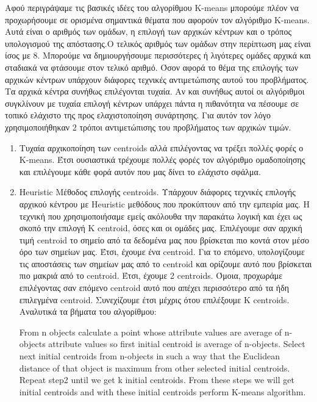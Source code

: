 Αφού περιγράψαμε τις βασικές ιδέες του αλγορίθμου K-means μπορούμε πλέον να προχωρήσουμε σε ορισμένα σημαντικά θέματα που αφορούν τον αλγόριθμο K-means. Αυτά είναι ο αριθμός των ομάδων, η επιλογή των αρχικών κέντρων και ο τρόπος υπολογισμού της απόστασης.Ο τελικός αριθμός των ομάδων στην περίπτωση μας είναι ίσος με 8. Μπορούμε να δημιουργήσουμε περισσότερες ή λιγότερες ομάδες αρχικά και σταδιακά να φτάσουμε στον τελικό αριθμό. Όσον αφορά το θέμα της επιλογής των αρχικών κέντρων υπάρχουν διάφορες τεχνικές αντιμετώπισης αυτού του προβλήματος. Τα αρχικά κέντρα συνήθως επιλέγονται τυχαία. Αν και συνήθως αυτοί οι αλγόριθμοι συγκλίνουν με τυχαία επιλογή κέντρων υπάρχει πάντα η πιθανότητα να πέσουμε σε τοπικό ελάχιστο της προς ελαχιστοποίηση συνάρτησης. Για αυτόν τον λόγο χρησιμοποιήθηκαν 2 τρόποι αντιμετώπισης του προβλήματος των αρχικών τιμών.
\begin{enumerate}
    \item Τυχαία αρχικοποίηση των centroids αλλά επιλέγοντας να τρέξει πολλές φορές ο K-means. Έτσι ουσιαστικά τρέχουμε πολλές φορές τον αλγόριθμο ομαδοποίησης και επιλέγουμε κάθε φορά αυτόν που μας δίνει το ελάχιστο σφάλμα.

    \item Heuristic Μέθοδος επιλογής centroids.
    Υπάρχουν διάφορες τεχνικές επιλογής αρχικού κέντρου με Heuristic μεθόδους που προκύπτουν από την εμπειρία μας.
    Η τεχνική που χρησιμοποιήσαμε εμείς ακόλουθα την παρακάτω λογική και έχει ως σκοπό την επιλογή Κ centroid, όσες και οι ομάδες μας.
    Επιλέγουμε σαν αρχική τιμή centroid το σημείο από τα δεδομένα μας που βρίσκεται πιο κοντά στον μέσο όρο των σημείων μας.
    Έτσι, έχουμε ένα centroid.
    Για το επόμενο, υπολογίζουμε τις αποστάσεις των σημείων μας από το centroid και ορίζουμε αυτό που βρίσκεται πιο μακριά από το centroid.
    Έτσι, έχουμε 2 centroids.
    Όμοια, προχωράμε επιλέγοντας σαν επόμενο centroid αυτό που απέχει περισσότερο από τα ήδη επιλεγμένα centroid.
    Συνεχίζουμε έτσι μέχρις ότου επιλέξουμε K centroids.
    Αναλυτικά τα βήματα του αλγορίθμου:\\
    \noindent\begin{minipage}{0.9\linewidth}
    \centering
    \begin{algorithm}[H]
        From n objects calculate a point whose attribute values are average of n-objects attribute values so first initial centroid is average of n-objects.\;
        Select next initial centroids from n-objects in such a way that the Euclidean distance of that object is maximum from other selected initial centroids.\;
        Repeat step2 until we get k initial centroids.
        From these steps we will get initial centroids and with these initial centroids perform K-means algorithm.\;
    \end{algorithm}
    \end{minipage}
\end{enumerate}

